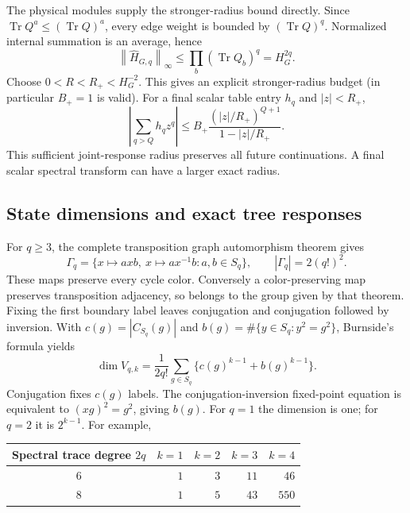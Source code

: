 \documentclass[11pt,a4paper]{amsart}
\numberwithin{equation}{section}
\theoremstyle{definition}
\theoremstyle{remark}
\DeclareMathOperator{\Tr}{Tr}
\newcommand{\norm}[1]{\left\lVert#1\right\rVert}
\begin{document}
The physical modules supply the stronger-radius bound directly. Since $\Tr Q^a\le(\Tr Q)^a$, every edge weight is bounded by $(\Tr Q)^q$. Normalized internal summation is an average, hence
\begin{equation}\label{eq:physical_growth}
 \norm{\widehat H_{G,q}}_\infty\le\prod_b(\Tr Q_b)^q=H_G^{2q}.
\end{equation}
Choose $0<R<R_+<H_G^{-2}$. This gives an explicit stronger-radius budget (in particular $B_+=1$ is valid). For a final scalar table entry $h_q$ and $|z|<R_+$,
\[
 \left|\sum_{q>Q}h_qz^q\right|
 \le B_+\frac{(|z|/R_+)^{Q+1}}{1-|z|/R_+}.
\]
This sufficient joint-response radius preserves all future continuations. A final scalar spectral transform can have a larger exact radius.

\subsection{State dimensions and exact tree responses}
For $q\ge3$, the complete transposition graph automorphism theorem \cite[Theorem~1.1]{Ganesan} gives
\[
 \Gamma_q=\{x\mapsto axb,\ x\mapsto ax^{-1}b:a,b\in S_q\},
 \qquad |\Gamma_q|=2(q!)^2.
\]
These maps preserve every cycle color. Conversely a color-preserving map preserves transposition adjacency, so belongs to the group given by that theorem. Fixing the first boundary label leaves conjugation and conjugation followed by inversion. With
$c(g)=|C_{S_q}(g)|$ and $b(g)=\#\{y\in S_q:y^2=g^2\}$,
Burnside's formula yields
\begin{equation}\label{eq:physical_dimension}
 \dim V_{q,k}=\frac1{2q!}\sum_{g\in S_q}
                  \{c(g)^{k-1}+b(g)^{k-1}\}.
\end{equation}
Conjugation fixes $c(g)$ labels. The conjugation-inversion fixed-point equation is equivalent to $(xg)^2=g^2$, giving $b(g)$. For $q=1$ the dimension is one; for $q=2$ it is $2^{k-1}$. For example,
\begin{center}
\begin{tabular}{@{}c rrrr@{}}\toprule
Spectral trace degree $2q$ & $k=1$ & $k=2$ & $k=3$ & $k=4$\\\midrule
$6$ & $1$ & $3$ & $11$ & $46$\\
$8$ & $1$ & $5$ & $43$ & $550$\\\bottomrule
\end{tabular}
\end{center}
\end{document}

